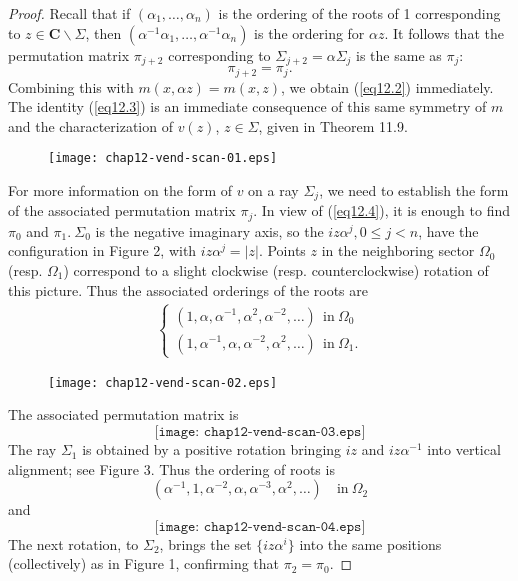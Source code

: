 \documentclass{surv-l}
\theoremstyle{plain}
\theoremstyle{definition}
\numberwithin{equation}{chapter}
\begin{document}
\begin{proof}
Recall that if $(\alpha_{1},\ldots,\alpha_{n})$ is the ordering of the roots of 1 corresponding to $ z\in \textbf{C}\backslash \Sigma$, then $(\alpha^{-1}\alpha_{1},\ldots, \alpha^{-1}\alpha_{n})$ is the ordering for $\alpha z$. It follows that the permutation matrix $\pi_{j+2}$ corresponding to $\Sigma_{j+2}=\alpha\Sigma_{j}$ is the same as $\pi_{j}$:
\begin{equation}\label{eq12.4}
\pi_{j+2}=\pi_{j}.
\end{equation}
Combining this with $m(x, \alpha z)=m(x, z)$, we obtain (\ref{eq12.2}) immediately. The identity (\ref{eq12.3}) is an immediate consequence of this same symmetry of $m$ and the characterization of $v(z)$, $ z\in\Sigma$, given in Theorem 11.9.

\begin{figure}
\texttt{[image: chap12-vend-scan-01.eps]}
\caption{}\label{chap12:fig2}
\end{figure}
For more information on the form of $v$ on a ray $\Sigma_{j}$, we need to establish the form of the associated permutation matrix $\pi_{j}$. In view of (\ref{eq12.4}), it is enough to
find $\pi_{0}$ and $\pi_{1}.\ \Sigma_{0}$ is the negative imaginary axis, so the $iz\alpha^{j}, 0\leq j<n$, have the configuration in Figure 2, with $iz\alpha^{j}=|z|$. Points $z$ in the neighboring sector $\Omega_{0}$ (resp. $\Omega_{1}$) correspond to a slight clockwise (resp. counterclockwise) rotation of this picture. Thus the associated orderings of the roots are
\begin{align}\label{eq12.5}
\left\{\begin{array}{l}
(1, \alpha, \alpha^{-1}, \alpha^{2}, \alpha^{-2},\ldots)\ \ \mathrm{in}\ \Omega_{0}\\
(1, \alpha^{-1}, \alpha, \alpha^{-2}, \alpha^{2}, \ldots)\ \ \mathrm{in}\ \Omega_{1}.
\end{array}\right.
\end{align}
\begin{figure}
\texttt{[image: chap12-vend-scan-02.eps]}
\caption{}
\end{figure}

The associated permutation matrix is
\begin{equation}
\texttt{[image: chap12-vend-scan-03.eps]}
\end{equation}
The ray $\Sigma_{1}$ is obtained by a positive rotation bringing $iz$ and $iz\alpha^{-1}$ into vertical alignment; see Figure 3. Thus the ordering of roots is
\setcounter{equation}{6}
\begin{equation}\label{eq12.7}
(\alpha^{-1}, 1,\alpha^{-2}, \alpha, \alpha^{-3}, \alpha^{2},\ldots)\quad \mathrm{in}\ \Omega_{2}
\end{equation}
and
\begin{equation}
\texttt{[image: chap12-vend-scan-04.eps]}
\end{equation}
The next rotation, to $\Sigma_{2}$, brings the set $\{iz\alpha^{i}\}$ into the same positions (collectively) as in Figure 1, confirming that $\pi_{2}=\pi_{0}$.


\end{proof}
\end{document}

